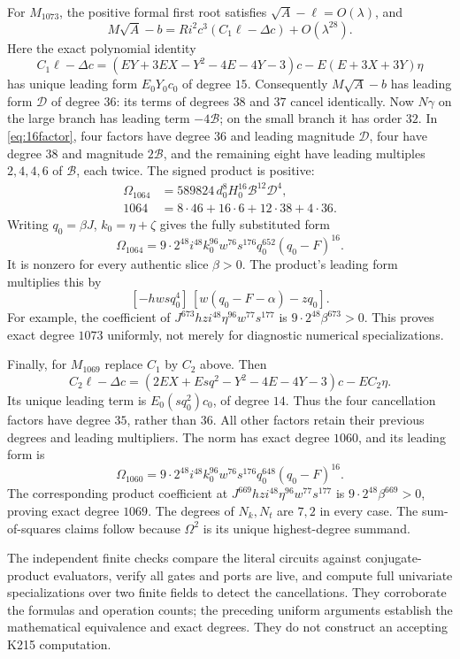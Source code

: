 \documentclass[11pt,letterpaper]{article}
\theoremstyle{remark}
\begin{document}
For $M_{1073}$, the positive formal first root satisfies
$\sqrt A-\ell=O(\lambda)$, and
\[
 M\sqrt A-b=Ri^2c^3(C_1\ell-\Delta c)+O(\lambda^{28}).
\]
Here the exact polynomial identity
\[
 C_1\ell-\Delta c
 =(EY+3EX-Y^2-4E-4Y-3)c-E(E+3X+3Y)\eta
\]
has unique leading form $E_0Y_0c_0$ of degree $15$.
Consequently $M\sqrt A-b$ has leading form $\mathcal D$ of degree $36$:
its terms of degrees $38$ and $37$ cancel identically.
Now $N\gamma$ on the large branch has leading term $-4\mathcal B$;
on the small branch it has order $32$.
In \eqref{eq:16factor}, four factors have degree $36$ and leading
magnitude $\mathcal D$, four have degree $38$ and magnitude
$2\mathcal B$, and the remaining eight have leading multiples
$2,4,4,6$ of $\mathcal B$, each twice. The signed product is positive:
\begin{align*}
 \Omega_{1064}
 &=589824\,d_0^8H_0^{16}\mathcal B^{12}\mathcal D^4,\\
 1064&=8\cdot46+16\cdot6+12\cdot38+4\cdot36.
\end{align*}
Writing $q_0=\beta J$, $k_0=\eta+\zeta$ gives the fully substituted form
\begin{equation}
 \Omega_{1064}=9\cdot2^{48}i^{48}k_0^{96}w^{76}s^{176}
                     q_0^{652}(q_0-F)^{16}.\label{eq:top1073}
\end{equation}
It is nonzero for every authentic slice $\beta>0$.
The product's leading form multiplies this by
\[
 [-hw s q_0^4]\,[w(q_0-F-\alpha)-zq_0].
\]
For example, the coefficient of
$J^{673}hz i^{48}\eta^{96}w^{77}s^{177}$ is
$9\cdot2^{48}\beta^{673}>0$. This proves exact degree $1073$ uniformly,
not merely for diagnostic numerical specializations.

Finally, for $M_{1069}$ replace $C_1$ by $C_2$ above. Then
\[
 C_2\ell-\Delta c
 =(2EX+Esq^2-Y^2-4E-4Y-3)c-EC_2\eta.
\]
Its unique leading term is $E_0(sq_0^2)c_0$, of degree $14$.
Thus the four cancellation factors have degree $35$, rather than $36$.
All other factors retain their previous degrees and leading multipliers.
The norm has exact degree $1060$, and its leading form is
\[
 \Omega_{1060}=9\cdot2^{48}i^{48}k_0^{96}w^{76}s^{176}
                     q_0^{648}(q_0-F)^{16}.
\]
The corresponding product coefficient at
$J^{669}hz i^{48}\eta^{96}w^{77}s^{177}$ is
$9\cdot2^{48}\beta^{669}>0$, proving exact degree $1069$.
The degrees of $N_k,N_t$ are $7,2$ in every case. The sum-of-squares
claims follow because $\Omega^2$ is its unique highest-degree summand.

The independent finite checks compare the literal circuits against
conjugate-product evaluators, verify all gates and ports are live, and
compute full univariate specializations over two finite fields to detect
the cancellations. They corroborate the formulas and operation counts;
the preceding uniform arguments establish the mathematical equivalence
and exact degrees. They do not construct an accepting K215 computation.
\end{document}
